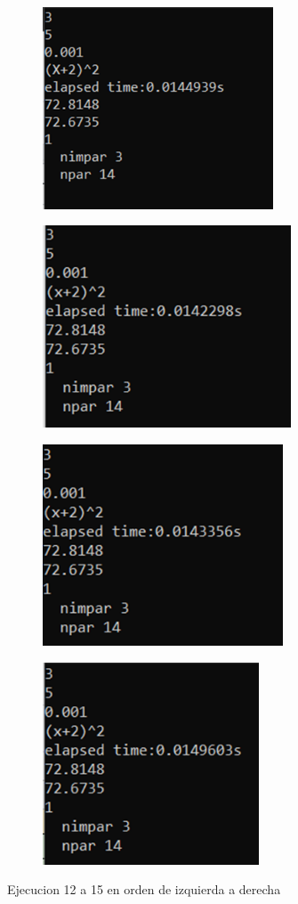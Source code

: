 \documentclass[12pt, letterpaper]{article}
\begin{document}
\begin{figure}[H]
    \begin{subfigure}{0.49\textwidth}
        \includegraphics[width=1\linewidth, height=6cm]{Imagen12} 
    \end{subfigure}
    \begin{subfigure}{0.49\textwidth}
        \includegraphics[width=1\linewidth, height=6cm]{Imagen13}
    \end{subfigure}
    \begin{subfigure}{0.49\textwidth}
        \includegraphics[width=1\linewidth, height=6cm]{Imagen14}
    \end{subfigure}
    \begin{subfigure}{0.49\textwidth}
        \includegraphics[width=1\linewidth, height=6cm]{Imagen15}
    \end{subfigure}

    \caption{Ejecucion 12 a 15 en orden de izquierda a derecha}
\end{figure}
\end{document}
